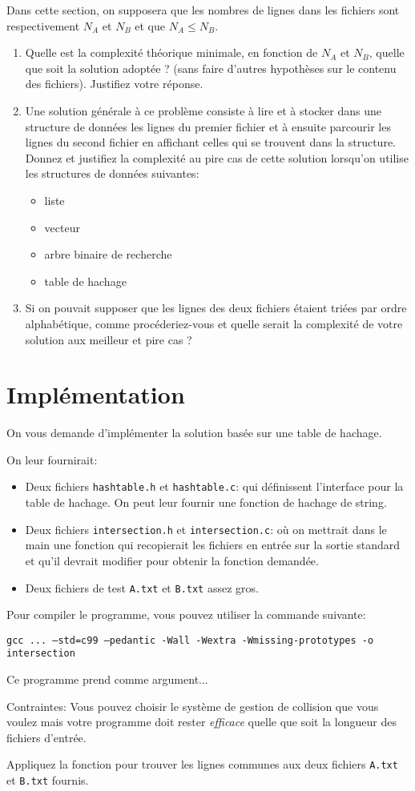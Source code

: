 \documentclass[a4paper,10pt]{article}
\begin{document}
Dans cette section, on supposera que les nombres de lignes dans les fichiers sont
respectivement $N_A$ et $N_B$ et que $N_A\leq N_B$.
\begin{enumerate}
\item Quelle est la complexité théorique minimale, en fonction de $N_A$ et $N_B$, quelle que soit la
  solution adoptée ? (sans faire d'autres hypothèses sur le contenu
  des fichiers). Justifiez votre réponse.
\item Une solution générale à ce problème consiste à lire et à stocker
  dans une structure de données les lignes du premier fichier et à
  ensuite parcourir les lignes du second fichier en affichant celles qui
  se trouvent dans la structure. Donnez et justifiez la complexité au pire cas de cette solution
  lorsqu'on utilise les structures de données suivantes:
\begin{itemize}
\item liste
\item vecteur
\item arbre binaire de recherche
\item table de hachage
\end{itemize}
\item Si on pouvait supposer que les lignes des deux fichiers étaient
  triées par ordre alphabétique, comme procéderiez-vous et quelle
  serait la complexité de votre solution aux meilleur et pire cas ?
\end{enumerate}

\section{Implémentation}

On vous demande d'implémenter la solution basée sur une table de
hachage.

On leur fournirait:
\begin{itemize}
\item Deux fichiers \texttt{hashtable.h} et \texttt{hashtable.c}: qui définissent l'interface pour la table de hachage. On peut leur fournir une fonction de hachage de string.
\item Deux fichiers \texttt{intersection.h} et \texttt{intersection.c}: où on mettrait
  dans le main une fonction qui recopierait les fichiers en entrée sur
  la sortie standard et qu'il devrait modifier pour obtenir la
  fonction demandée.
\item Deux fichiers de test \texttt{A.txt} et \texttt{B.txt} assez gros.
\end{itemize}

Pour compiler le programme, vous pouvez utiliser la commande suivante:

{\small \texttt{gcc ... --std=c99 --pedantic -Wall -Wextra -Wmissing-prototypes -o intersection}}

Ce programme prend comme argument...

Contraintes: Vous pouvez choisir le système de gestion de collision
que vous voulez mais votre programme doit rester {\it efficace} quelle
que soit la longueur des fichiers d'entrée.

Appliquez la fonction pour trouver les lignes communes aux deux
fichiers \texttt{A.txt} et \texttt{B.txt} fournis.
\end{document}
